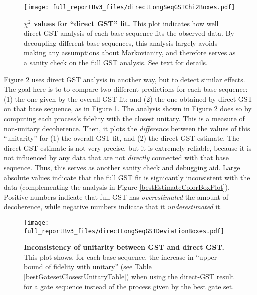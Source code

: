 {\begin{figure}
\begin{center}
\texttt{[image: full\_reportBv3\_files/directLongSeqGSTChi2Boxes.pdf]}
\caption{\textbf{$\chi^2$ values for ``direct GST'' fit.}  This plot indicates how well direct GST analysis of each base sequence fits the observed data.  By decoupling different base sequences, this analysis largely avoids making any assumptions about Markovianity, and therefore serves as a sanity check on the full GST analysis.  See text for details.\label{directLSGSTChi2BoxPlot}}
\end{center}
\end{figure}

Figure \ref{directLSGSTDeviationBoxPlot} uses direct GST analysis in another way, but to detect similar effects.   The goal here is to to compare two different predictions for each base sequence:  (1) the one given by the overall GST fit; and (2) the one obtained by direct GST on that base sequence, as in Figure \ref{directLSGSTChi2BoxPlot}.  The analysis shown in Figure \ref{directLSGSTDeviationBoxPlot} does so by computing each process's fidelity with the closest unitary.  This is a measure of non-unitary decoherence.  Then, it plots the \emph{difference} between the values of this ``unitarity'' for (1) the overall GST fit, and (2) the direct GST estimate.  The direct GST estimate is not very precise, but it is extremely reliable, because it is not influenced by any data that are not \emph{directly} connected with that base sequence.  Thus, this serves as another sanity check and debugging aid.  Large absolute values indicate that the full GST fit is signicantly inconsistent with the data (complementing the analysis in Figure \ref{bestEstimateColorBoxPlot}).  Positive numbers indicate that full GST has \emph{overestimated} the amount of decoherence, while negative numbers indicate that it \emph{underestimated} it.

\begin{figure}
\begin{center}
\texttt{[image: full\_reportBv3\_files/directLongSeqGSTDeviationBoxes.pdf]}
\caption{\textbf{Inconsistency of unitarity between GST and direct GST.}  This plot shows, for each base sequence, the increase in ``upper bound of fidelity with unitary'' (see Table \ref{bestGatesetClosestUnitaryTable}) when using the direct-GST result for a gate sequence instead of the process given by the best gate set.\label{directLSGSTDeviationBoxPlot}}
\end{center}
\end{figure}

}
